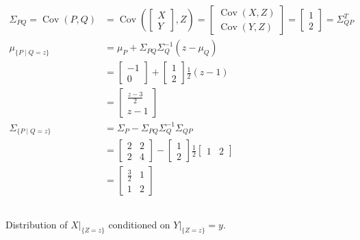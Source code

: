 \documentclass{article}
\theoremstyle{definition} %
\begin{document}
\begin{align*}
    \Sigma_{P Q}=\operatorname{Cov}(P, Q)&=\operatorname{Cov}\left(\left[\begin{array}{l}
    X \\
    Y
    \end{array}\right], Z\right)=\left[\begin{array}{l}
    \operatorname{Cov}(X, Z) \\
    \operatorname{Cov}(Y, Z)
    \end{array}\right]=\left[\begin{array}{l}
    1 \\
    2
    \end{array}\right]=\Sigma_{Q P}^T\\
    \mu_{\{P \mid Q=z\}}&=\mu_P+\Sigma_{P Q} \Sigma_Q^{-1}\left(z-\mu_Q\right)\\
    &=\left[\begin{array}{c}
    -1\\
    0
    \end{array}\right]+\left[\begin{array}{l}
    1 \\
    2
    \end{array}\right] \frac{1}{2}(z-1)\\
    &=\left[\begin{array}{c}
    \frac{z-3}{2} \\
    z-1
    \end{array}\right]\\
    \Sigma_{\{P \mid Q=z\}}&=\Sigma_P-\Sigma_{P Q} \Sigma_Q^{-1} \Sigma_{Q P}\\
    &=\left[\begin{array}{ll}
    2 & 2 \\
    2 & 4
    \end{array}\right]-\left[\begin{array}{l}
    1 \\
    2
    \end{array}\right] \frac{1}{2}\left[\begin{array}{ll}
    1 & 2
    \end{array}\right]\\
    &=\left[\begin{array}{cc}
    \frac{3}{2} & 1 \\
    1 & 2
    \end{array}\right]
\end{align*}

\subsection{}
Distribution of $\left.X\right|_{\{Z=z\}}$ conditioned on $\left.Y\right|_{\{Z=z\}}=y$.
\end{document}
